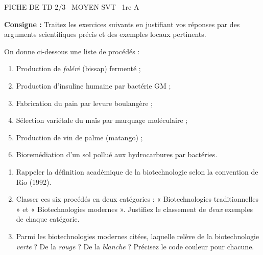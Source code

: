 \documentclass[11pt]{article}
\begin{document}
\begin{tcolorbox}[enhanced,colback=popink,colframe=popink,arc=10pt,boxrule=0pt,left=12pt,right=12pt,top=9pt,bottom=9pt]
{\color{white}\popxbold\small FICHE DE TD 2/3 \textbullet\ MOYEN \hfill SVT \textbullet\ 1re A\par}
\end{tcolorbox}
\vspace{4pt}
\noindent \textbf{Consigne :} Traitez les exercices suivants en justifiant vos réponses par des arguments scientifiques précis et des exemples locaux pertinents.

\begin{exercice}
On donne ci-dessous une liste de procédés : 
\begin{enumerate}
    \item Production de \textit{foléré} (bissap) fermenté ; \item Production d'insuline humaine par bactérie GM ; \item Fabrication du pain par levure boulangère ; \item Sélection variétale du maïs par marquage moléculaire ; \item Production de vin de palme (matango) ; \item Bioremédiation d'un sol pollué aux hydrocarbures par bactéries.
\end{enumerate}
\begin{enumerate}
    \item Rappeler la définition académique de la biotechnologie selon la convention de Rio (1992).
    \item Classer ces six procédés en deux catégories : « Biotechnologies traditionnelles » et « Biotechnologies modernes ». Justifiez le classement de \textit{deux} exemples de chaque catégorie.
    \item Parmi les biotechnologies modernes citées, laquelle relève de la biotechnologie \textit{verte} ? De la \textit{rouge} ? De la \textit{blanche} ? Précisez le code couleur pour chacune.
\end{enumerate}
\end{exercice}
\end{document}

